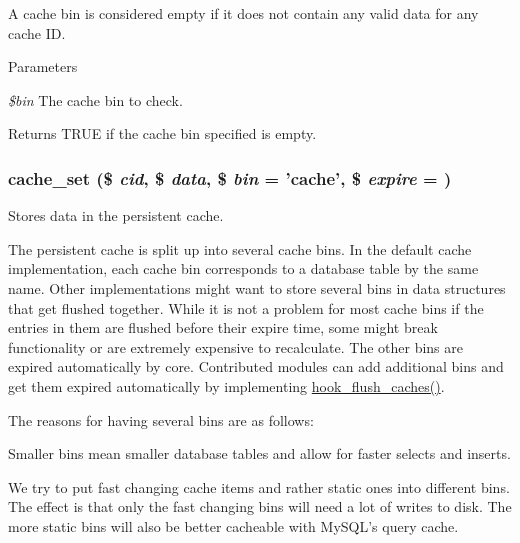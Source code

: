 A cache bin is considered empty if it does not contain any valid data for any cache ID.


\begin{DoxyParams}{Parameters}
\item[{\em \$bin}]The cache bin to check.\end{DoxyParams}
\begin{DoxyReturn}{Returns}
TRUE if the cache bin specified is empty. 
\end{DoxyReturn}
\hypertarget{includes_2cache_8inc_a48081f36334909f561ef4f538fa640d2}{
\subsubsection[{cache\_\-set}]{\setlength{\rightskip}{0pt plus 5cm}cache\_\-set (\$ {\em cid}, \/  \$ {\em data}, \/  \$ {\em bin} = {\ttfamily 'cache'}, \/  \$ {\em expire} = {})}}
\label{includes_2cache_8inc_a48081f36334909f561ef4f538fa640d2}
Stores data in the persistent cache.

The persistent cache is split up into several cache bins. In the default cache implementation, each cache bin corresponds to a database table by the same name. Other implementations might want to store several bins in data structures that get flushed together. While it is not a problem for most cache bins if the entries in them are flushed before their expire time, some might break functionality or are extremely expensive to recalculate. The other bins are expired automatically by core. Contributed modules can add additional bins and get them expired automatically by implementing \hyperlink{group__hooks_ga66531e6e564157b7ca45ed07549c9b97}{hook\_\-flush\_\-caches()}.

The reasons for having several bins are as follows:
\begin{DoxyItemize}
\item Smaller bins mean smaller database tables and allow for faster selects and inserts.
\item We try to put fast changing cache items and rather static ones into different bins. The effect is that only the fast changing bins will need a lot of writes to disk. The more static bins will also be better cacheable with MySQL's query cache.
\end{DoxyItemize}


